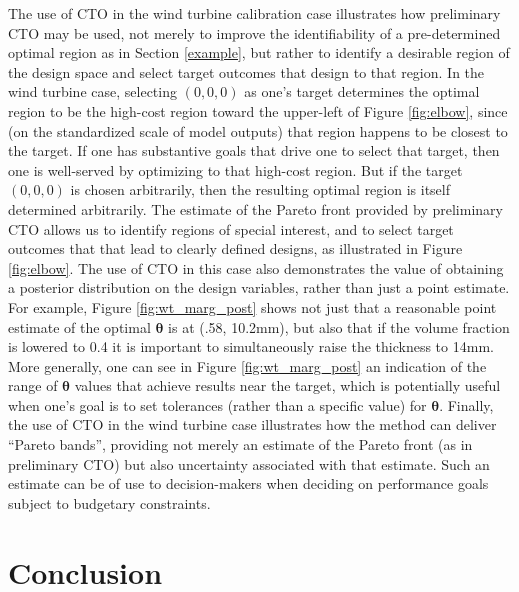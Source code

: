 \documentclass[12pt]{article}
\begin{document}
The use of CTO in the wind turbine calibration case illustrates how preliminary CTO may be used, not merely to improve the identifiability of a pre-determined optimal region as in Section \ref{example}, but rather to identify a desirable region of the design space and select target outcomes that design to that region.
%
In the wind turbine case, selecting $(0,0,0)$ as one's target determines the optimal region to be the high-cost region toward the upper-left of Figure \ref{fig:elbow}, since (on the standardized scale of model outputs) that region happens to be closest to the target.
%
If one has substantive goals that drive one to select that target, then one is well-served by optimizing to that high-cost region.
%
But if the target $(0,0,0)$ is chosen arbitrarily, then the resulting optimal region is itself determined arbitrarily.
%
The estimate of the Pareto front provided by preliminary CTO allows us to identify regions of special interest, and to select target outcomes that that lead to clearly defined designs, as illustrated in Figure \ref{fig:elbow}.
%
The use of CTO in this case also demonstrates the value of obtaining a posterior distribution on the design variables, rather than just a point estimate.
%
For example, Figure \ref{fig:wt_marg_post} shows not just that a reasonable point estimate of the optimal $\boldsymbol\theta$ is at (.58, 10.2mm), but also that if the volume fraction is lowered to 0.4 it is important to simultaneously raise the thickness to 14mm.
%
More generally, one can see in Figure \ref{fig:wt_marg_post} an indication of the range of $\boldsymbol\theta$ values that achieve results near the target, which is potentially useful when one's goal is to set tolerances (rather than a specific value) for $\boldsymbol\theta$.
%
Finally, the use of CTO in the wind turbine case illustrates how the method can deliver ``Pareto bands'', providing not merely an estimate of the Pareto front (as in preliminary CTO) but also uncertainty associated with that estimate.
%
Such an estimate can be of use to decision-makers when deciding on performance goals subject to budgetary constraints.




\section{Conclusion} \label{conclusion}
\end{document}
